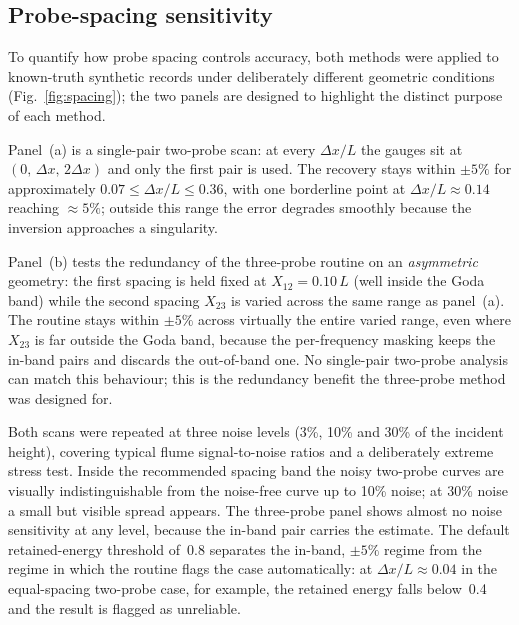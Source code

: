 \documentclass[preprint,12pt,a4paper]{elsarticle}
\begin{document}
\subsection{Probe-spacing sensitivity}
To quantify how probe spacing controls accuracy, both methods were
applied to known-truth synthetic records under deliberately different
geometric conditions (Fig.~\ref{fig:spacing}); the two panels are
designed to highlight the distinct purpose of each method.

Panel~(a) is a single-pair two-probe scan: at every $\Delta x/L$ the
gauges sit at $(0,\,\Delta x,\,2\Delta x)$ and only the first pair is
used. The recovery stays within $\pm 5\%$ for approximately
$0.07 \le \Delta x/L \le 0.36$, with one borderline point at
$\Delta x/L \approx 0.14$ reaching $\approx 5\%$; outside this range
the error degrades smoothly because the inversion approaches a
singularity.

Panel~(b) tests the redundancy of the three-probe routine on an
\emph{asymmetric} geometry: the first spacing is held fixed at
$X_{12}=0.10\,L$ (well inside the Goda band) while the second spacing
$X_{23}$ is varied across the same range as panel~(a). The routine
stays within $\pm 5\%$ across virtually the entire varied range, even
where $X_{23}$ is far outside the Goda band, because the per-frequency
masking keeps the in-band pairs and discards the out-of-band one. No
single-pair two-probe analysis can match this behaviour; this is the
redundancy benefit the three-probe method was designed for.

Both scans were repeated at three noise levels (3\%, 10\% and 30\% of
the incident height), covering typical flume signal-to-noise ratios
and a deliberately extreme stress test. Inside the recommended spacing
band the noisy two-probe curves are visually indistinguishable from
the noise-free curve up to 10\% noise; at 30\% noise a small but
visible spread appears. The three-probe panel shows almost no noise
sensitivity at any level, because the in-band pair carries the
estimate. The default retained-energy threshold of~0.8 separates the
in-band, $\pm 5\%$ regime from the regime in which the routine flags
the case automatically: at $\Delta x/L \approx 0.04$ in the
equal-spacing two-probe case, for example, the retained energy falls
below~0.4 and the result is flagged as unreliable.
\end{document}
